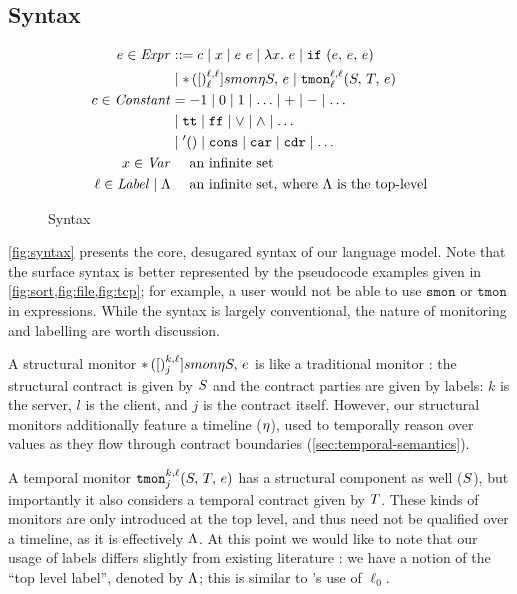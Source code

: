 \subsection{Syntax}
\FloatBarrier

\begin{figure}
\begin{align*}
e \in \mathit{Expr} &::=
      c
 \mid x
 \mid e\ e
 \mid \lambda x.\ e
 \mid {\tt if}{\ }({e,\,e,\,e}) \\
&\mid {\tt *}{\,}({[})^{\ell,\ell}_{\ell}]{smon}{\eta}{S,\, e}
 \mid {\tt tmon}{^{\ell,\ell}_{\ell}}({S,\,T,\,e}) \\
c \in \mathit{Constant} &=
 -1 \mid 0 \mid 1 \mid \ldots \mid + \mid - \mid \ldots \\
&\mid {\tt tt} \mid {\tt ff} \mid \vee \mid \wedge \mid \ldots \\
&\mid {\tt '()} \mid \tt cons \mid {\tt car} \mid {\tt cdr} \mid \ldots \\
x \in \mathit{Var} &\quad\text{ an infinite set} \\
\ell \in \mathit{Label} \mid \Lambda &\quad\text{ an infinite set, where $\Lambda$ is the top-level}
\end{align*}
\caption{Syntax}
\label{fig:syntax}
\end{figure}

%
\autoref{fig:syntax} presents the core, desugared syntax of our language model.
%
Note that the surface syntax is better represented by the pseudocode examples given in \cref{fig:sort,fig:file,fig:tcp}; for example, a user would not be able to use $\mathtt{smon}$ or $\mathtt{tmon}$ in expressions.
%
While the syntax is largely conventional, the nature of monitoring and labelling are worth discussion.

%
A structural monitor ${\tt *}{\,}({[})^{k,\ell}_{j}]{smon}{\eta}{S,\, e}$ is like a traditional monitor \cite{ianjohnson:dthf:complete}: the structural contract is given by $S$ and the contract parties are given by labels: $k$ is the server, $l$ is the client, and $j$ is the contract itself.
%
However, our structural monitors additionally feature a timeline ($\eta$), used to temporally reason over values as they flow through contract boundaries (\autoref{sec:temporal-semantics}).
%

%
A temporal monitor ${\tt tmon}{^{k,\ell}_{j}}({S,\,T,\,e})$ has a structural component as well ($S$), but importantly it also considers a temporal contract given by $T$.
%
These kinds of monitors are only introduced at the top level, and thus need not be qualified over a timeline, as it is effectively $\Lambda$.
%
At this point we would like to note that our usage of labels differs slightly from existing literature \cite{ianjohnson:dthf:complete}: we have a notion of the ``top level label'', denoted by $\Lambda$; this is similar to \citeauthor{ianjohnson:dthf:complete}'s use of $\ell_0$.

